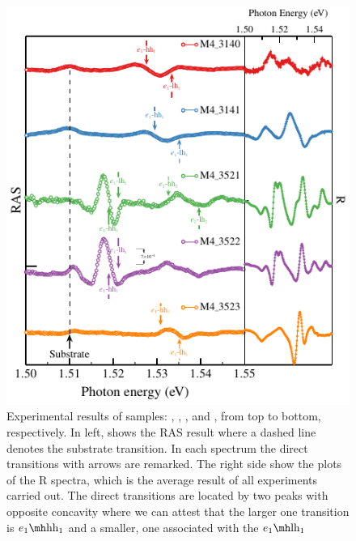 \begin{figure}[ht!]
	\centering
	\includegraphics[width=\textwidth]{../figures/chapter-3/ras-plots/build-ruco/ras-set-2.pdf}
	\caption{
		Experimental results of samples: , , ,  and , from top to bottom, respectively. In left, shows the RAS result where a dashed line denotes the substrate transition. In each spectrum the direct transitions with arrows are remarked. The right side show the plots of the R spectra, which is the average result of all experiments carried out. The direct transitions are located by two peaks with opposite concavity where we can attest that the larger one transition is $\thh{1}{1}$ and a smaller, one associated with the $\tlh{1}{1}$
		}
	\label{fig:chapter-3-subsec-ras-plots-set-2}
\end{figure}
